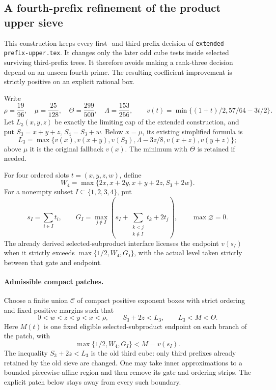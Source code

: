 
\subsection{A fourth-prefix refinement of the product upper sieve}
\label{sec:fourth-prefix-K-refinement-route}

This construction keeps every first- and third-prefix decision of
\texttt{extended-prefix-upper.tex}. It changes only the later odd
cube tests inside selected surviving third-prefix trees.
It therefore avoids making a rank-three decision depend on an
unseen fourth prime. The resulting coefficient improvement is
strictly positive on an explicit rational box.

Write
\[
 \rho=\frac{19}{96},\quad \mu=\frac{25}{128},\quad
 \Theta=\frac{299}{500},\quad \Lambda=\frac{153}{256},
 \qquad v(t)=\min\{(1+t)/2,57/64-3t/2\}.
\]
Let \(L_3(x,y,z)\) be exactly the limiting cap of the extended
construction, and put \(S_3=x+y+z\), \(S_4=S_3+w\).
Below \(x=\mu\), its existing simplified formula is
\[
 L_3=\max\{v(x),v(x+y),v(S_3),
                 \Lambda-3z/8,v(x+z),v(y+z)\};
\]
above \(\mu\) it is the original fallback \(v(x)\).
The minimum with \(\Theta\) is retained if needed.

For four ordered slots \(t=(x,y,z,w)\), define
\[
 W_4=\max\{2x,x+2y,x+y+2z,S_3+2w\}.
\]
For a nonempty subset \(I\subseteq\{1,2,3,4\}\), put
\[
 s_I=\sum_{i\in I}t_i,\qquad
 G_I=\max_{j\notin I}
       \left(s_I+\sum_{\substack{k<j\\k\notin I}}t_k+2t_j\right),
 \qquad \max\varnothing=0.
\]
The already derived selected-subproduct interface licenses
the endpoint \(v(s_I)\) when it strictly exceeds
\(\max\{1/2,W_4,G_I\}\), with the actual level taken strictly
between that gate and endpoint.

\paragraph{Admissible compact patches.}
Choose a finite union \(\mathcal C\) of compact positive exponent
boxes with strict ordering and fixed positive margins such that
\[
 0<w<z<y<x<\rho,\qquad S_3+2z<L_3,
 \qquad L_3<M<\Theta .
\]
Here \(M(t)\) is one fixed eligible selected-subproduct endpoint
on each branch of the patch, with
\[
 \max\{1/2,W_4,G_I\}<M=v(s_I).
\]
The inequality \(S_3+2z<L_3\) is the old third cube:
only third prefixes already retained by the old sieve are changed.
One may take inner approximations to a bounded piecewise-affine
region and then remove its gate and ordering strips.
The explicit patch below stays away from every such boundary.

